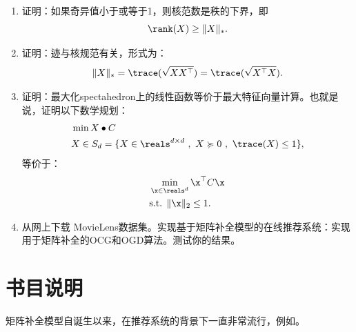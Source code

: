 \begin{enumerate}

\item
证明：如果奇异值小于或等于1，则核范数是秩的下界，即 $$ \rank(X) \geq \|X\|_* .$$

\item
证明：迹与核规范有关，形式为：
$$ \| X \|_* = \trace( \sqrt{X X^\top} ) = \trace( \sqrt{ X^\top X} ) .$$

\item
证明：最大化spectahedron上的线性函数等价于最大特征向量计算。也就是说，证明以下数学规划：
\begin{align*} 
& \min  X \bullet C  \\
& X \in S_d = \{ X \in \reals^{d \times d} \ , \ X \succcurlyeq 0 \ , \ \trace(X)  \leq 1 \} ,
\end{align*}  
等价于：
\begin{align*} 
& \min_{\x \in \reals^d}  \x^\top C \x  \\
& \mbox{s.t.  }   \|\x\|_2  \leq 1 .
\end{align*}  


\item

从网上下载 MovieLens数据集。实现基于矩阵补全模型的在线推荐系统：实现用于矩阵补全的OCG和OGD算法。测试你的结果。

\end{enumerate}





\newpage
\section{
    书目说明
    }

矩阵补全模型自诞生以来，在推荐系统的背景下一直非常流行，例如\cite{SrebroThesis,Rennie:2005,salakhutdinov:collaborative,lee:practical,CandesR09,ShamirS11}。

